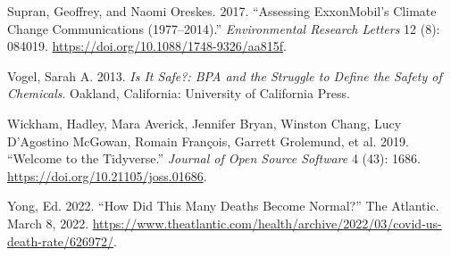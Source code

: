 \documentclass[
  letterpaper,
  DIV=11,
  numbers=noendperiod]{scrartcl}
\newlength{\cslhangindent}
\newlength{\cslentryspacingunit} %
\newenvironment{CSLReferences}[2] %
 {%
  \setlength{\parindent}{0pt}
  \ifodd #1
  \let\oldpar\par
  \def\par{\hangindent=\cslhangindent\oldpar}
  \fi
  \setlength{\parskip}{#2\cslentryspacingunit}
 }%
 {}
\begin{document}
\begin{CSLReferences}{1}{0}
\leavevmode{}%
Supran, Geoffrey, and Naomi Oreskes. 2017. {``Assessing ExxonMobil's
Climate Change Communications (1977--2014).''} \emph{Environmental
Research Letters} 12 (8): 084019.
\url{https://doi.org/10.1088/1748-9326/aa815f}.

\leavevmode{}%
Vogel, Sarah A. 2013. \emph{Is It Safe?: BPA and the Struggle to Define
the Safety of Chemicals}. Oakland, California: University of California
Press.

\leavevmode{}%
Wickham, Hadley, Mara Averick, Jennifer Bryan, Winston Chang, Lucy
D'Agostino McGowan, Romain François, Garrett Grolemund, et al. 2019.
{``Welcome to the Tidyverse.''} \emph{Journal of Open Source Software} 4
(43): 1686. \url{https://doi.org/10.21105/joss.01686}.

\leavevmode{}%
Yong, Ed. 2022. {``How Did This Many Deaths Become Normal?''} The
Atlantic. March 8, 2022.
\url{https://www.theatlantic.com/health/archive/2022/03/covid-us-death-rate/626972/}.

\end{CSLReferences}
\end{document}
